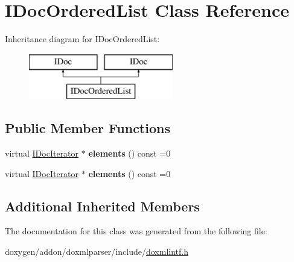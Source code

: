 \hypertarget{class_i_doc_ordered_list}{}\section{I\+Doc\+Ordered\+List Class Reference}
\label{class_i_doc_ordered_list}
Inheritance diagram for I\+Doc\+Ordered\+List\+:\begin{figure}[H]
\begin{center}
\leavevmode
\includegraphics[height=2.000000cm]{class_i_doc_ordered_list}
\end{center}
\end{figure}
\subsection*{Public Member Functions}
\begin{DoxyCompactItemize}
\item 
\mbox{\label{class_i_doc_ordered_list_a8eec6fa1693ba2287d0322c6ce0a901b}} 
virtual \mbox{\hyperlink{class_i_doc_iterator}{I\+Doc\+Iterator}} $\ast$ {\bfseries elements} () const =0
\item 
\mbox{\label{class_i_doc_ordered_list_a8eec6fa1693ba2287d0322c6ce0a901b}} 
virtual \mbox{\hyperlink{class_i_doc_iterator}{I\+Doc\+Iterator}} $\ast$ {\bfseries elements} () const =0
\end{DoxyCompactItemize}
\subsection*{Additional Inherited Members}


The documentation for this class was generated from the following file\+:\begin{DoxyCompactItemize}
\item 
doxygen/addon/doxmlparser/include/\mbox{\hyperlink{include_2doxmlintf_8h}{doxmlintf.\+h}}\end{DoxyCompactItemize}
